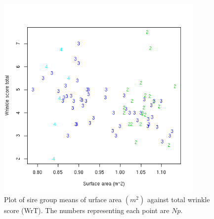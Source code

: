 %

\begin{figure}[!h]
  \centering
   \includegraphics[width=0.9\textwidth]{sawrt.png}
  \caption{Plot of sire group means  of urface area $(m^{2})$ against total wrinkle score (WrT). The numbers representing each point are $Np$.}
  \label{fig:sawrt}
\end{figure}

%

